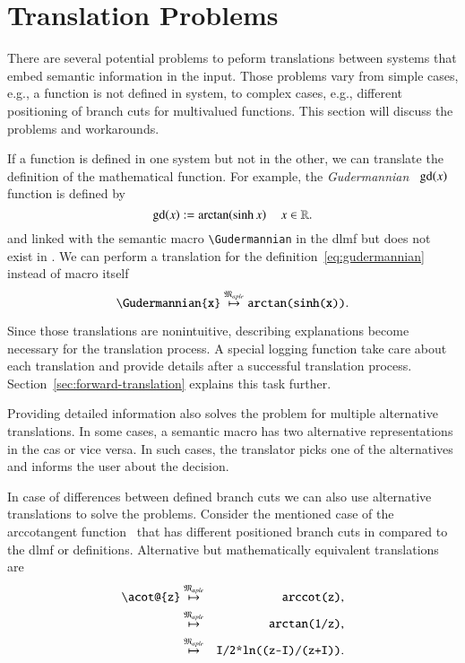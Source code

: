 \section{Translation Problems}
There are several potential problems to peform translations between systems that embed semantic information in the input. Those problems vary from simple cases, e.g., a function is not defined in system, to complex cases, e.g., different positioning of branch cuts for multivalued functions. This section will discuss the problems and workarounds.

If a function is defined in one system but not in the other, we can translate the definition of the mathematical function. For example, the \textit{Gudermannian}~\parencite[eq. 4.23.10]{NIST:DLMF} $\mathrm{gd}\!\left(x\right)$ function is defined by
\begin{equation}\label{eq:gudermannian}
\mathrm{gd}\!\left(x\right) := \mathrm{arctan}\!\left(\sinh{x}\right) \quad x \in \mathbb{R}.
\end{equation}
and linked with the semantic macro \verb|\Gudermannian| in the \gls*{dlmf} but does not exist in \Maple. We can perform a translation for the definition~\ref{eq:gudermannian} instead of macro itself
\begin{equation}\label{eq:guder-trans}
\verb|\Gudermannian{x}| \overset{\langMaple}{\mapsto} \texttt{arctan(sinh(x))}.
\end{equation}

Since those translations are nonintuitive, describing explanations become necessary for the translation process. A special logging function take care about each translation and provide details after a successful translation process. Section~\ref{sec:forward-translation} explains this task further.

Providing detailed information also solves the problem for multiple alternative translations. In some cases, a semantic macro has two alternative representations in the \gls*{cas} or vice versa. In such cases, the translator picks one of the alternatives and informs the user about the decision.

In case of differences between defined branch cuts we can also use alternative translations to solve the problems. Consider the mentioned case of the arccotangent function~\parencite{Branches:acot} that has different positioned branch cuts in \Maple{} compared to the \gls*{dlmf} or \Mathematica{} definitions. Alternative but mathematically equivalent translations are
\begin{eqnarray}
\verb|\acot@{z}| & \overset{\langMaple}{\mapsto} & \verb|arccot(z)|,\label{eq:acot-alternatives}\\
& \overset{\langMaple}{\mapsto} & \verb|arctan(1/z)|,\label{eq:acot-alternatives-1}\\
& \overset{\langMaple}{\mapsto} & \verb|I/2*ln((z-I)/(z+I))|.\label{eq:acot-alternatives-2}
\end{eqnarray}

